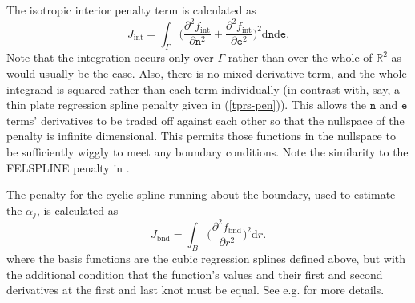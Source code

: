 
The isotropic interior penalty term is calculated as
$$
J_\text{int} = \int_\Gamma \Big(\frac{\partial^2 f_\text{int}}{\partial \texttt{n}^2}+\frac{\partial^2 f_\text{int}}{\partial \texttt{e}^2} 
\Big)^2\text{d}\texttt{n}\text{d}\texttt{e}.
$$
Note that the integration occurs only over $\Gamma$ rather than over the whole of $\mathbb{R}^2$ as would usually be the case. Also, there is no mixed derivative term, and the whole integrand is squared rather than each term individually (in contrast with, say, a thin plate regression spline penalty given in (\ref{tprs-pen})). This allows the $\texttt{n}$ and $\texttt{e}$ terms' derivatives to be traded off against each other so that the nullspace of the penalty is infinite dimensional. This permits those functions in the nullspace to be sufficiently wiggly to meet any boundary conditions. Note the similarity to the FELSPLINE penalty in .

The penalty for the cyclic spline running about the boundary, used to estimate the $\alpha_j$, is calculated as 
$$
J_\text{bnd} = \int_B \Big(\frac{\partial^2 f_\text{bnd}}{\partial r^2}\Big)^2 \text{d}r.
$$
where the basis functions are the cubic regression splines defined above, but with the additional condition that the function's values and their first and second derivatives at the first and last knot must be equal. See e.g. \cite[p. 149]{simonbook} for more details.

